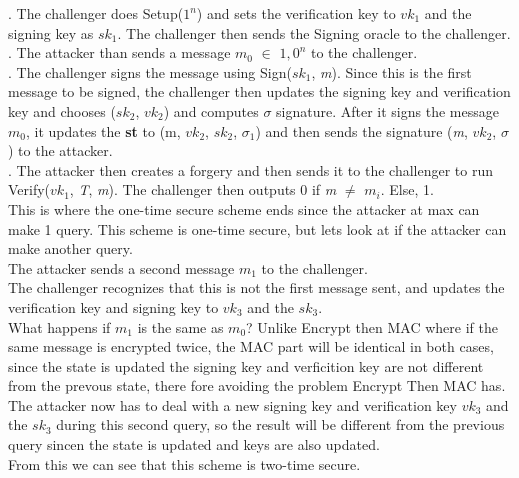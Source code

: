 \documentclass[10pt]{article}
\begin{document}
. The challenger does Setup($1^{n}$) and sets the verification key to \textbf{$vk_{1}$} and the signing key as \textbf{$sk_{1}$}. The challenger then sends the  Signing oracle to the challenger.\\
. The attacker than sends a message \emph{$m_{0}$} $\in$ ${1,0}^{n}$ to the challenger.\\
. The challenger signs the message using Sign(\textbf{$sk_{1}$}, \emph{m}). Since this is the first message to be signed, the challenger then updates the signing key and verification key and chooses ($sk_{2}$, $vk_{2}$) and computes $\sigma$ signature. After it signs the message \emph{$m_{0}$}, it updates the \textbf{st} to {(m, $vk_{2}$, $sk_{2}$, $\sigma_{1}$)} and then sends the signature (\emph{m}, $vk_{2}$, $\sigma$) to the attacker.\\ 
. The attacker then creates a forgery and then sends it to the challenger to run Verify($vk_{1}$, \emph{T}, \emph{m}). The challenger then outputs 0 if \emph{m} $\neq$ \emph{$m_{i}$}. Else, 1.\\

\indent This is where the one-time secure scheme ends since the attacker at max can make 1 query. This scheme is one-time secure, but lets look at if the attacker can make another query.\\

\indent The attacker sends a second message $m_{1}$ to the challenger.\\

\indent The challenger recognizes that this is not the first message sent, and updates the verification key and signing key to \textbf{$vk_{3}$} and the \textbf{$sk_{3}$}.\\

\indent What happens if $m_{1}$ is the same as $m_{0}$? Unlike Encrypt then MAC where if the same message is encrypted twice, the MAC part will be identical in both cases, since the state is updated the signing key and verficition key are not different from the prevous state, there fore avoiding the problem Encrypt Then MAC has.\\

\indent The attacker now has to deal with a new signing key and verification key \textbf{$vk_{3}$} and the \textbf{$sk_{3}$} during this second query, so the result will be different from the previous query sincen the state is updated and keys are also updated.\\
\indent From this we can see that this scheme is two-time secure.\\
\end{document}
